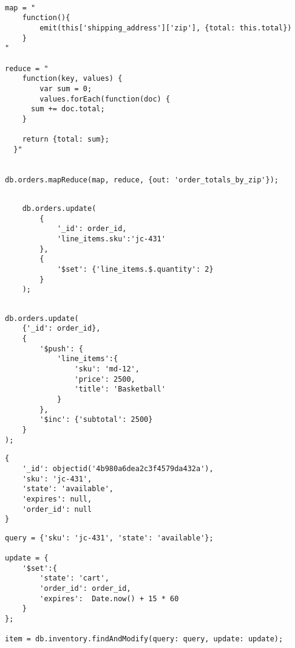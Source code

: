 \medskip
\begin{lstlisting}[caption= Ejemplo de comando \mapReduce., label=source:javascript:example_aggregation_mongodb]

map = "
    function(){
        emit(this['shipping_address']['zip'], {total: this.total})
    }
"

reduce = "
    function(key, values) {
        var sum = 0;
        values.forEach(function(doc) {
      sum += doc.total;
    }

    return {total: sum};
  }"


db.orders.mapReduce(map, reduce, {out: 'order_totals_by_zip'});

\end{lstlisting}



\medskip
\begin{lstlisting}[caption= Ejemplo de uso de \positionOperatorDB., label=source:javascript:example_incrementing_quality_mongodb]

    db.orders.update(
        {
            '_id': order_id,
            'line_items.sku':'jc-431'
        },
        {
            '$set': {'line_items.$.quantity': 2}
        }
    );
        
\end{lstlisting}


\medskip
\begin{lstlisting}[caption= Ejemplo del operador \pushOperatorDB., label=source:javascript:example_push_operator_mongodb]
db.orders.update(
    {'_id': order_id},
    {
        '$push': {
            'line_items':{
                'sku': 'md-12',
                'price': 2500,
                'title': 'Basketball'
            }
        },
        '$inc': {'subtotal': 2500}
    }
);
\end{lstlisting}


\medskip
\begin{lstlisting}[caption= Ejemplo de \documentDB para un \itemCOM., label=source:javascript:example_document_inventory_mongodb]
{
    '_id': objectid('4b980a6dea2c3f4579da432a'),
    'sku': 'jc-431',
    'state': 'available',
    'expires': null,
    'order_id': null
}
\end{lstlisting}


\medskip
\begin{lstlisting}[caption= Marcando un \itemCOM con tiempo de espiración., label=source:javascript:example_add_inventory_expiartion_mongodb]
query = {'sku': 'jc-431', 'state': 'available'};

update = {
    '$set':{
        'state': 'cart',
        'order_id': order_id,
        'expires':  Date.now() + 15 * 60
    }
};

item = db.inventory.findAndModify(query: query, update: update);
\end{lstlisting}


